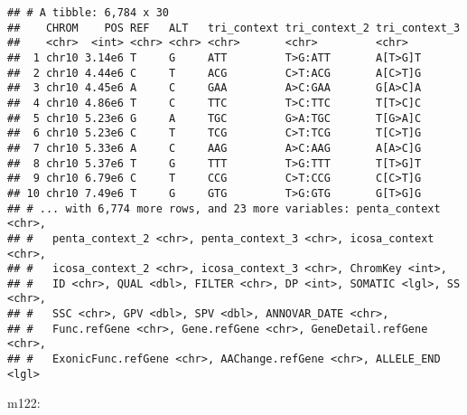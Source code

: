 \documentclass[]{article}
\begin{document}
\begin{verbatim}
## # A tibble: 6,784 x 30
##    CHROM    POS REF   ALT   tri_context tri_context_2 tri_context_3
##    <chr>  <int> <chr> <chr> <chr>       <chr>         <chr>        
##  1 chr10 3.14e6 T     G     ATT         T>G:ATT       A[T>G]T      
##  2 chr10 4.44e6 C     T     ACG         C>T:ACG       A[C>T]G      
##  3 chr10 4.45e6 A     C     GAA         A>C:GAA       G[A>C]A      
##  4 chr10 4.86e6 T     C     TTC         T>C:TTC       T[T>C]C      
##  5 chr10 5.23e6 G     A     TGC         G>A:TGC       T[G>A]C      
##  6 chr10 5.23e6 C     T     TCG         C>T:TCG       T[C>T]G      
##  7 chr10 5.33e6 A     C     AAG         A>C:AAG       A[A>C]G      
##  8 chr10 5.37e6 T     G     TTT         T>G:TTT       T[T>G]T      
##  9 chr10 6.79e6 C     T     CCG         C>T:CCG       C[C>T]G      
## 10 chr10 7.49e6 T     G     GTG         T>G:GTG       G[T>G]G      
## # ... with 6,774 more rows, and 23 more variables: penta_context <chr>,
## #   penta_context_2 <chr>, penta_context_3 <chr>, icosa_context <chr>,
## #   icosa_context_2 <chr>, icosa_context_3 <chr>, ChromKey <int>,
## #   ID <chr>, QUAL <dbl>, FILTER <chr>, DP <int>, SOMATIC <lgl>, SS <chr>,
## #   SSC <chr>, GPV <dbl>, SPV <dbl>, ANNOVAR_DATE <chr>,
## #   Func.refGene <chr>, Gene.refGene <chr>, GeneDetail.refGene <chr>,
## #   ExonicFunc.refGene <chr>, AAChange.refGene <chr>, ALLELE_END <lgl>
\end{verbatim}

m122:
\end{document}
